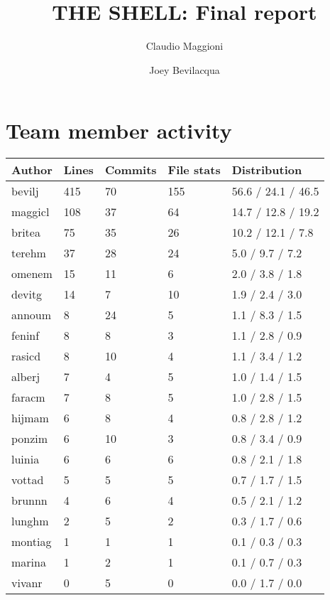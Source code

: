\documentclass[hidelinks,12pt,a4paper,numbers=enddot]{scrartcl}
\title{THE SHELL: Final report}
\author{Claudio Maggioni \and Joey Bevilacqua}
\begin{document}
\maketitle
\tableofcontents
\newpage

\section{Team member activity}

\begin{table}[h]
\centering
\begin{tabular}{lllll}
\textbf{Author} & \textbf{Lines} & \textbf{Commits} & \textbf{File stats} & \textbf{Distribution} \\ \hline
bevilj  & 415 &   70 &  155 & 56.6 / 24.1 / 46.5 \\
maggicl & 108 &   37 &   64 & 14.7 / 12.8 / 19.2 \\
britea  &  75 &   35 &   26 & 10.2 / 12.1 / 7.8 \\
terehm  &  37 &   28 &   24 &  5.0 / 9.7 / 7.2 \\
omenem  &  15 &   11 &    6 &  2.0 / 3.8 / 1.8 \\
devitg  &  14 &    7 &   10 &  1.9 / 2.4 / 3.0 \\
annoum  &   8 &   24 &    5 &  1.1 / 8.3 / 1.5 \\
feninf  &   8 &    8 &    3 &  1.1 / 2.8 / 0.9 \\
rasicd  &   8 &   10 &    4 &  1.1 / 3.4 / 1.2 \\
alberj  &   7 &    4 &    5 &  1.0 / 1.4 / 1.5 \\
faracm  &   7 &    8 &    5 &  1.0 / 2.8 / 1.5 \\
hijmam  &   6 &    8 &    4 &  0.8 / 2.8 / 1.2 \\
ponzim  &   6 &   10 &    3 &  0.8 / 3.4 / 0.9 \\
luinia  &   6 &    6 &    6 &  0.8 / 2.1 / 1.8 \\
vottad  &   5 &    5 &    5 &  0.7 / 1.7 / 1.5 \\
brunnn  &   4 &    6 &    4 &  0.5 / 2.1 / 1.2 \\
lunghm  &   2 &    5 &    2 &  0.3 / 1.7 / 0.6 \\
montiag &   1 &    1 &    1 &  0.1 / 0.3 / 0.3 \\
marina  &   1 &    2 &    1 &  0.1 / 0.7 / 0.3 \\
vivanr  &   0 &    5 &    0 &  0.0 / 1.7 / 0.0 \\
\end{tabular}
\end{table}
\end{document}
